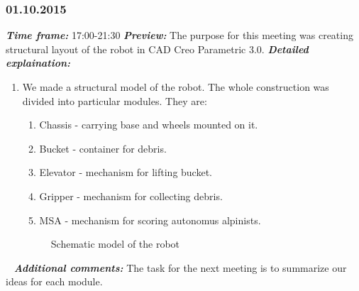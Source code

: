 \subsubsection{01.10.2015}
	\textit{\textbf{Time frame:}} 17:00-21:30 \newline
	\textit{\textbf{Preview:}} The purpose for this meeting was creating structural layout of the robot in CAD Creo Parametric 3.0.\newline \newline
  \textit{\textbf{Detailed explaination:}}
  \begin{enumerate}
  	\item We made a structural model of the robot. The whole construction was divided into particular modules. They are:
  	\begin{enumerate}
  		\item Chassis - carrying base and wheels mounted on it.
  		
  		\item Bucket - container for debris.
  		
  		\item Elevator - mechanism for lifting bucket.
  		
  		\item Gripper - mechanism for collecting debris.
  		
  		\item MSA - mechanism for scoring autonomus alpinists.
  	\end{enumerate}
  	\begin{figure}[H]
  		\begin{minipage}[h]{1\linewidth}
  			\caption{Schematic model of the robot}
  		\end{minipage}
  	\end{figure}
  	
  \end{enumerate}
  
   \newline
  \textit{\textbf{Additional comments:}} The task for the next meeting is to summarize our ideas for each module.

\fillpage
